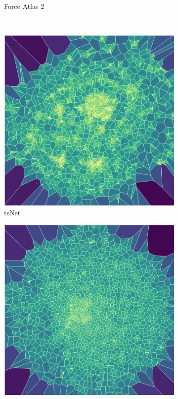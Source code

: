 \begin{figure}[H]
\begin{subfigure}[b]{.49\textwidth}
         \caption{Force Atlas 2}
         \label{fig:afa}
         \end{subfigure}\\
     \begin{subfigure}[b]{.49\textwidth}
         \centering \includegraphics[width=\textwidth,angle=-90]{figures_c1/area/fill_tsnetloc.png}
         \caption{tsNet}
         \label{fig:ats}
     \end{subfigure}
    \begin{subfigure}[b]{.49\textwidth}
         \centering \includegraphics[width=\textwidth,angle=-180]{figures_c1/area/fill_oo_aphh.png}

\end{subfigure}
\end{figure}
